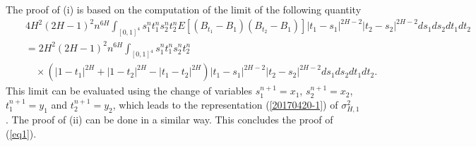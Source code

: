 \documentclass[a4paper]{article}
\numberwithin{equation}{section}
\begin{document}
 The proof of (i) is based on the computation of the limit of the following quantity
      \begin{eqnarray*}
 && 4H^2 (2H-1)^2 n^{6H} \int_{[0,1]^4} s_1^n t_1^n s_2^n t_2^n E[(B_{t_1}-B_1)(B_{t_2} -B_1)] |t_1-s_1| ^{2H-2}
 |t_2-s_2| ^{2H-2} ds_1ds_2 dt_1 dt_2 \\
  &&=2H^2 (2H-1)^2 n^{6H} \int_{[0,1]^4} s_1^n t_1^n s_2^n t_2^n\\
  &&\quad \times  ( |1-t_1|^{2H} + |1-t_2|^{2H} - |t_1-t_2|^{2H} ) |t_1-s_1| ^{2H-2}
 |t_2-s_2| ^{2H-2} ds_1ds_2 dt_1 dt_2 .
 \end{eqnarray*}
 This limit can be evaluated using the change of variables $ s_1^{n+1} =x_1$,  $ s_2^{n+1} =x_2$, $t_1^{n+1} =y_1$
 and $  t_2^{n+1} = y_2$, which leads
 to   the representation (\ref{20170420-1}) of $\sigma_{H,1}^2$.
  The proof of (ii) can be done in a similar way.  This concludes the proof of (\ref{eq1}).
  
\end{document}
